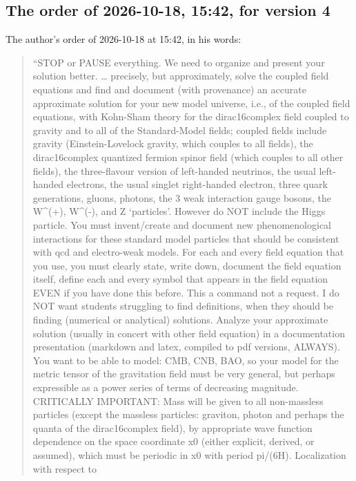 \documentclass[
  10pt,
]{article}
\begin{document}
\hypertarget{the-order-of-2026-10-18-1542-for-version-4}{%
\subsection{The order of 2026-10-18, 15:42, for version
4}\label{the-order-of-2026-10-18-1542-for-version-4}}

The author's order of 2026-10-18 at 15:42, in his words:

\begin{quote}
``STOP or PAUSE everything. We need to organize and present your
solution better. \ldots{} precisely, but approximately, solve the
coupled field equations and find and document (with provenance) an
accurate approximate solution for your new model universe, i.e., of the
coupled field equations, with Kohn-Sham theory for the dirac16complex
field coupled to gravity and to all of the Standard-Model fields;
coupled fields include gravity (Einstein-Lovelock gravity, which couples
to all fields), the dirac16complex quantized fermion spinor field (which
couples to all other fields), the three-flavour version of left-handed
neutrinos, the usual left-handed electrons, the usual singlet
right-handed electron, three quark generations, gluons, photons, the 3
weak interaction gauge bosons, the W\^{}(+), W\^{}(-), and Z
`particles'. However do NOT include the Higgs particle. You must
invent/create and document new phenomenological interactions for these
standard model particles that should be consistent with qcd and
electro-weak models. For each and every field equation that you use, you
must clearly state, write down, document the field equation itself,
define each and every symbol that appears in the field equation EVEN if
you have done this before. This a command not a request. I do NOT want
students struggling to find definitions, when they should be finding
(numerical or analytical) solutions. Analyze your approximate solution
(usually in concert with other field equation) in a documentation
presentation (markdown and latex, compiled to pdf versions, ALWAYS). You
want to be able to model: CMB, CNB, BAO, so your model for the metric
tensor of the gravitation field must be very general, but perhaps
expressible as a power series of terms of decreasing magnitude.
CRITICALLY IMPORTANT: Mass will be given to all non-massless particles
(except the massless particles: graviton, photon and perhaps the quanta
of the dirac16complex field), by appropriate wave function dependence on
the space coordinate x0 (either explicit, derived, or assumed), which
must be periodic in x0 with period pi/(6H). Localization with respect to

\end{quote}
\end{document}
